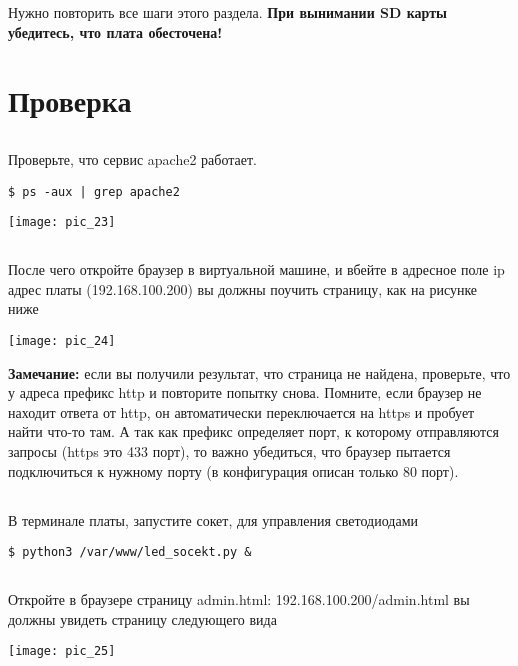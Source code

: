 Нужно повторить все шаги этого раздела. \textbf{При вынимании SD карты убедитесь, что плата обесточена!}

\section{Проверка}

\subsection{}Проверьте, что сервис apache2 работает. 
\begin{lstlisting}[style=bash]
$ ps -aux | grep apache2
\end{lstlisting}
\begin{center}
	\texttt{[image: pic\_23]}
\end{center}

\subsection{}После чего откройте браузер в виртуальной машине, и вбейте в адресное поле ip адрес платы (192.168.100.200) вы должны поучить страницу, как на рисунке ниже
\begin{center}
	\texttt{[image: pic\_24]}
\end{center}
\textbf{Замечание:} если вы получили результат, что страница не найдена, проверьте, что у адреса префикс http и повторите попытку снова. Помните, если браузер не находит ответа от http, он автоматически переключается на https и пробует найти что-то там. А так как префикс определяет порт, к которому отправляются запросы (https это 433 порт), то важно убедиться, что браузер пытается подключиться к нужному порту (в конфигурация описан только 80 порт).

\subsection{}В терминале платы, запустите сокет, для управления светодиодами 
\begin{lstlisting}[style=bash]
$ python3 /var/www/led_socekt.py &
\end{lstlisting}

\subsection{}Откройте в браузере страницу admin.html: 192.168.100.200/admin.html
вы должны увидеть страницу следующего вида
\begin{center}
	\texttt{[image: pic\_25]}
\end{center}


